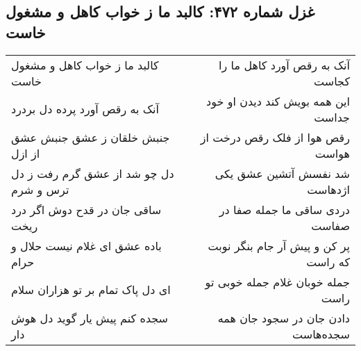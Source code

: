 \begin{center}
\section*{غزل شماره ۴۷۲: کالبد ما ز خواب کاهل و مشغول خاست}
\label{sec:0472}
\begin{longtable}{l p{0.5cm} r}
کالبد ما ز خواب کاهل و مشغول خاست
&&
آنک به رقص آورد کاهل ما را کجاست
\\
آنک به رقص آورد پرده دل بردرد
&&
این همه بویش کند دیدن او خود جداست
\\
جنبش خلقان ز عشق جنبش عشق از ازل
&&
رقص هوا از فلک رقص درخت از هواست
\\
دل چو شد از عشق گرم رفت ز دل ترس و شرم
&&
شد نفسش آتشین عشق یکی اژدهاست
\\
ساقی جان در قدح دوش اگر درد ریخت
&&
دردی ساقی ما جمله صفا در صفاست
\\
باده عشق ای غلام نیست حلال و حرام
&&
پر کن و پیش آر جام بنگر نوبت که راست
\\
ای دل پاک تمام بر تو هزاران سلام
&&
جمله خوبان غلام جمله خوبی تو راست
\\
سجده کنم پیش یار گوید دل هوش دار
&&
دادن جان در سجود جان همه سجده‌هاست
\\
\end{longtable}
\end{center}
